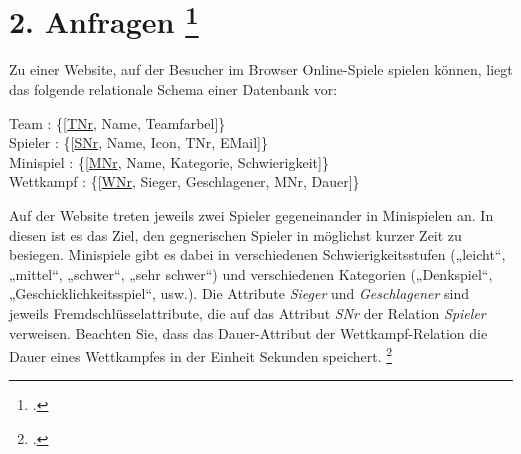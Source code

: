 \documentclass{bschlangaul-aufgabe}
\begin{document}

\section{2. Anfragen
\footcite[Thema 1 Teilaufgabe 2 Aufgabe 2]{examen:46116:2013:03}
}

Zu einer Website, auf der Besucher im Browser Online-Spiele spielen
können, liegt das folgende relationale Schema einer Datenbank vor:

\bigskip

{
\ttfamily
\noindent
Team : \{[\underline{TNr}, Name, Teamfarbel]\}\\
Spieler : \{[\underline{SNr}, Name, Icon, TNr, EMail]\}\\
Minispiel : \{[\underline{MNr}, Name, Kategorie, Schwierigkeit]\}\\
Wettkampf : \{[\underline{WNr}, Sieger, Geschlagener, MNr, Dauer]\}\\
}

\bigskip

Auf der Website treten jeweils zwei Spieler gegeneinander in Minispielen
an. In diesen ist es das Ziel, den gegnerischen Spieler in möglichst
kurzer Zeit zu besiegen. Minispiele gibt es dabei in verschiedenen
Schwierigkeitsstufen („leicht“, „mittel“, „schwer“, „sehr schwer“) und
verschiedenen Kategorien („Denkspiel“, „Geschicklichkeitsspiel“, usw.).
Die Attribute \emph{Sieger} und \emph{Geschlagener} sind jeweils
Fremdschlüsselattribute, die auf das Attribut \emph{SNr} der Relation
\emph{Spieler} verweisen. Beachten Sie, dass das Dauer-Attribut der
Wettkampf-Relation die Dauer eines Wettkampfes in der Einheit Sekunden
speichert.
\footcite{db:ab:examen-rs-2013-03}
\end{document}
